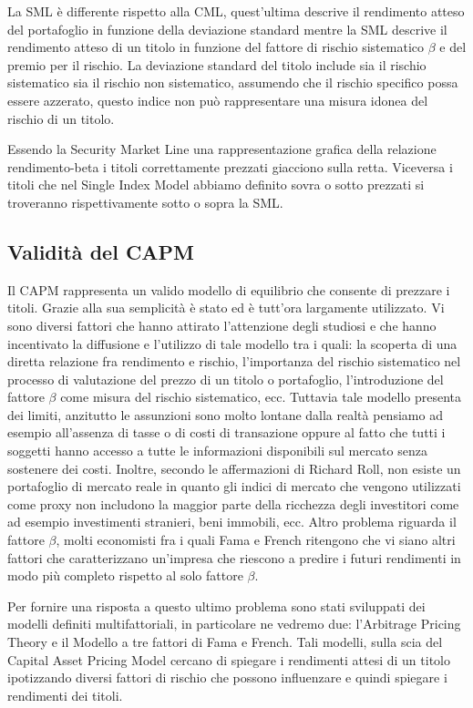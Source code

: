 La SML è differente rispetto alla CML, quest'ultima descrive il rendimento atteso del portafoglio in funzione della deviazione standard mentre la SML descrive il rendimento atteso di un titolo in funzione del fattore di rischio sistematico $\beta$ e del premio per il rischio. La deviazione standard del titolo include sia il rischio sistematico sia il rischio non sistematico, assumendo che il rischio specifico possa essere azzerato, questo indice non può rappresentare una misura idonea del rischio di un titolo. 

Essendo la Security Market Line una rappresentazione grafica della relazione rendimento-beta i titoli correttamente prezzati giacciono sulla retta. Viceversa i titoli che nel Single Index Model abbiamo definito sovra o sotto prezzati si troveranno rispettivamente sotto o sopra la SML.

\subsection{Validità del CAPM}


Il CAPM rappresenta un valido modello di equilibrio che consente di prezzare i titoli. Grazie alla sua semplicità è stato ed è tutt'ora largamente utilizzato. Vi sono diversi fattori che hanno attirato l'attenzione degli studiosi e che hanno incentivato la diffusione e l'utilizzo di tale modello tra i quali: la scoperta di una diretta relazione fra rendimento e rischio, l'importanza del rischio sistematico nel processo di valutazione del prezzo di un titolo o portafoglio, l'introduzione del fattore $\beta$ come misura del rischio sistematico, ecc. Tuttavia tale modello presenta dei limiti, anzitutto le assunzioni sono molto lontane dalla realtà pensiamo ad esempio all'assenza di tasse o di costi di transazione oppure al fatto che tutti i soggetti hanno accesso a tutte le informazioni disponibili sul mercato senza sostenere dei costi. Inoltre, secondo le affermazioni di Richard Roll, non esiste un portafoglio di mercato reale in quanto gli indici di mercato che vengono utilizzati come proxy non includono la maggior parte della ricchezza degli investitori come ad esempio investimenti stranieri, beni immobili, ecc. Altro problema riguarda il fattore $\beta$, molti economisti fra i quali Fama e French ritengono che vi siano altri fattori che caratterizzano un'impresa che riescono a predire i futuri rendimenti in modo più completo rispetto al solo fattore $\beta$. 


Per fornire una risposta a questo ultimo problema sono stati sviluppati dei modelli definiti multifattoriali, in particolare ne vedremo due: l'Arbitrage Pricing Theory e il Modello a tre fattori di Fama e French. Tali modelli, sulla scia del Capital Asset Pricing Model cercano di spiegare i rendimenti attesi di un titolo ipotizzando diversi fattori di rischio che possono influenzare e quindi spiegare i rendimenti dei titoli.

